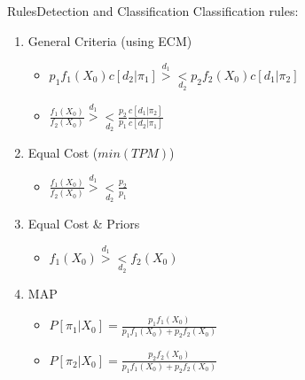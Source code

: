 \documentclass[aspectratio=169,10pt,t]{beamer}
\begin{document}
\begin{frame}{Rules}{Detection and Classification}
    Classification rules: 
    \begin{enumerate}
        \item General Criteria (using ECM)
        \begin{itemize}
            \item $ p_1 f_1(X_0) c[d_2 | \pi_1] \overset{d_1}{>}\underset{d_2}{<} p_2 f_2(X_0) c[d_1 | \pi_2]$
            \item $ \frac{f_1(X_0)}{f_2(X_0)} \overset{d_1}{>}\underset{d_2}{<} \frac{p_2}{p_1} \frac{c[d_1 | \pi_2]}{c[d_2 | \pi_1]}$
        \end{itemize}
        \item Equal Cost ($min(TPM)$)
        \begin{itemize}
            \item $ \frac{f_1(X_0)}{f_2(X_0)} \overset{d_1}{>}\underset{d_2}{<} \frac{p_2}{p_1}$
        \end{itemize}
        \item Equal Cost \& Priors
        \begin{itemize}
            \item $ f_1(X_0) \overset{d_1}{>}\underset{d_2}{<} f_2(X_0)$
        \end{itemize}
        \item MAP
        \begin{itemize}
            \item $P[\pi_1 | X_0 ] = \frac{p_1 f_1(X_0)}{p_1 f_1(X_0) + p_2 f_2(X_0)}$
            \item $P[\pi_2 | X_0 ] = \frac{p_2 f_2(X_0)}{p_1 f_1(X_0) + p_2 f_2(X_0)}$
        \end{itemize}
    \end{enumerate}
\end{frame}
\end{document}

